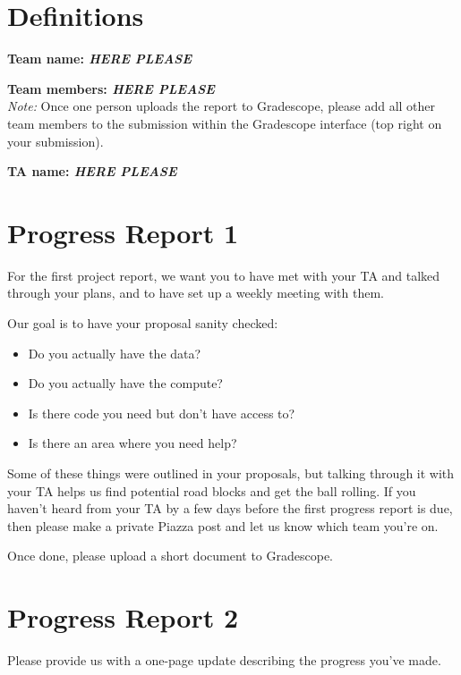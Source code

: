 \section*{Definitions}

\textbf{Team name: \emph{HERE PLEASE}}

\textbf{Team members: \emph{HERE PLEASE}}\\
\emph{Note:} Once one person uploads the report to Gradescope, please add all other team members to the submission within the Gradescope interface (top right on your submission).

\textbf{TA name: \emph{HERE PLEASE}}

\section*{Progress Report 1}
For the first project report, we want you to have met with your TA and talked through your plans, and to have set up a weekly meeting with them.

Our goal is to have your proposal sanity checked:
\begin{itemize}
  \item Do you actually have the data?
  \item Do you actually have the compute?
  \item Is there code you need but don't have access to?
  \item Is there an area where you need help?
\end{itemize}

Some of these things were outlined in your proposals, but talking through it with your TA helps us find potential road blocks and get the ball rolling.
If you haven't heard from your TA by a few days before the first progress report is due, then please make a private Piazza post and let us know which team you're on. 

Once done, please upload a short document to Gradescope.


\section*{Progress Report 2}

Please provide us with a one-page update describing the progress you've made.



